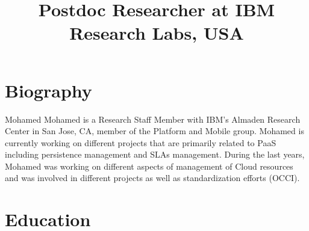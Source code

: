 \documentclass[11pt,a4paper,sans]{moderncv}   %
\title{Postdoc Researcher at IBM Research Labs, USA}               %
\begin{document}

\makecvtitle
\section{Biography} 
Mohamed Mohamed is a Research Staff Member with IBM's Almaden Research Center in San Jose, CA, member of the Platform and Mobile group. Mohamed is currently working on different projects that are primarily related to PaaS including persistence management and SLAs management. During 
the last years, Mohamed was working on different aspects of management of Cloud resources and was involved in different projects as well as standardization efforts (OCCI).

          


\section{Education}




\end{document}
